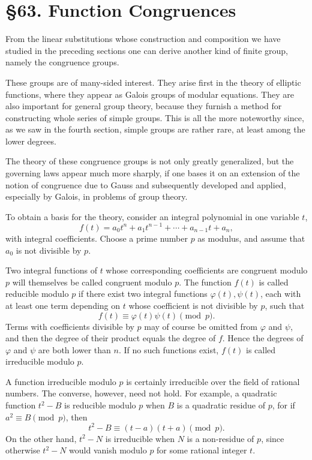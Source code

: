 \documentclass[11pt,a4paper]{article}
\newcommand{\webersection}[2]{\section*{\S #1. #2}\addcontentsline{toc}{section}{\S #1. #2}}
\begin{document}
\webersection{63}{Function Congruences}

From the linear substitutions whose construction and composition we have studied in the preceding sections one can derive another kind of finite group, namely the congruence groups.

These groups are of many-sided interest.  They arise first in the theory of elliptic functions, where they appear as Galois groups of modular equations.  They are also important for general group theory, because they furnish a method for constructing whole series of simple groups.  This is all the more noteworthy since, as we saw in the fourth section, simple groups are rather rare, at least among the lower degrees.

The theory of these congruence groups is not only greatly generalized, but the governing laws appear much more sharply, if one bases it on an extension of the notion of congruence due to Gauss and subsequently developed and applied, especially by Galois, in problems of group theory.

To obtain a basis for the theory, consider an integral polynomial in one variable \(t\),
\begin{equation}\label{eq:63-1}
 f(t)=a_0t^n+a_1t^{n-1}+\cdots+a_{n-1}t+a_n,
\end{equation}
with integral coefficients.  Choose a prime number \(p\) as modulus, and assume that \(a_0\) is not divisible by \(p\).

Two integral functions of \(t\) whose corresponding coefficients are congruent modulo \(p\) will themselves be called congruent modulo \(p\).  The function \(f(t)\) is called reducible modulo \(p\) if there exist two integral functions \(\varphi(t),\psi(t)\), each with at least one term depending on \(t\) whose coefficient is not divisible by \(p\), such that
\begin{equation}\label{eq:63-2}
 f(t)\equiv \varphi(t)\psi(t)\pmod p.
\end{equation}
Terms with coefficients divisible by \(p\) may of course be omitted from \(\varphi\) and \(\psi\), and then the degree of their product equals the degree of \(f\).  Hence the degrees of \(\varphi\) and \(\psi\) are both lower than \(n\).  If no such functions exist, \(f(t)\) is called irreducible modulo \(p\).

A function irreducible modulo \(p\) is certainly irreducible over the field of rational numbers.  The converse, however, need not hold.  For example, a quadratic function \(t^2-B\) is reducible modulo \(p\) when \(B\) is a quadratic residue of \(p\), for if \(a^2\equiv B\pmod p\), then
\[
 t^2-B\equiv (t-a)(t+a)\pmod p.
\]
On the other hand, \(t^2-N\) is irreducible when \(N\) is a non-residue of \(p\), since otherwise \(t^2-N\) would vanish modulo \(p\) for some rational integer \(t\).
\end{document}
